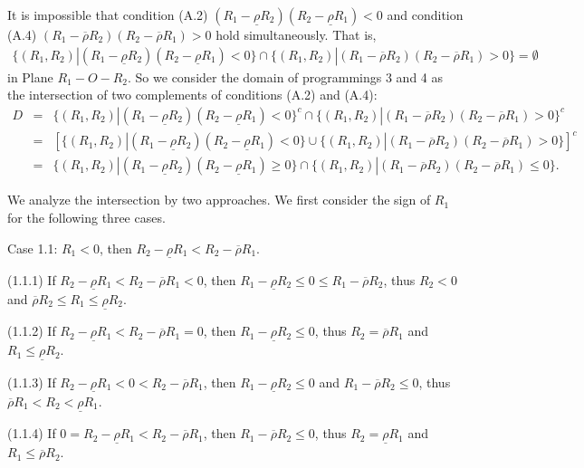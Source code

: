 \documentclass[10pt]{article}
\begin{document}
It is impossible that condition (A.2) $ (R_1 - \underline{\rho} R_2) (R_2 - \underline{\rho} R_1) < 0 $ and condition (A.4) $ (R_1 - \overline{\rho} R_2) (R_2 - \overline{\rho} R_1) > 0 $ hold simultaneously. That is,
\begin{eqnarray*}
\{ (R_1, R_2) | (R_1 - \underline{\rho} R_2) (R_2 - \underline{\rho} R_1) < 0 \} \cap \{ (R_1, R_2) | (R_1 - \overline{\rho} R_2) (R_2 - \overline{\rho} R_1) > 0 \} = \emptyset
\end{eqnarray*}
in Plane $ R_1 - O - R_2 $. So we consider the domain of programmings 3 and 4 as the intersection of two complements of conditions (A.2) and (A.4):
\begin{eqnarray*}
D & = & \{ (R_1, R_2) | (R_1 - \underline{\rho} R_2) (R_2 - \underline{\rho} R_1) < 0 \}^c \cap \{ (R_1, R_2) | (R_1 - \overline{\rho} R_2) (R_2 - \overline{\rho} R_1) > 0 \}^c \\
& = & \left[ \{ (R_1, R_2) | (R_1 - \underline{\rho} R_2) (R_2 - \underline{\rho} R_1) < 0 \} \cup \{ (R_1, R_2) | (R_1 - \overline{\rho} R_2) (R_2 - \overline{\rho} R_1) > 0 \} \right]^c \\
& = & \{ (R_1, R_2) | (R_1 - \underline{\rho} R_2) (R_2 - \underline{\rho} R_1) \geqslant 0 \} \cap \{ (R_1, R_2) | (R_1 - \overline{\rho} R_2) (R_2 - \overline{\rho} R_1) \leqslant 0 \}.
\end{eqnarray*}

We analyze the intersection by two approaches. We first consider the sign of $ R_1 $ for the following three cases.

Case 1.1: $ R_1 < 0 $, then $ R_2 - \underline{\rho} R_1 < R_2 - \overline{\rho} R_1 $.

(1.1.1) If $ R_2 - \underline{\rho} R_1 < R_2 - \overline{\rho} R_1 < 0 $, then $ R_1 - \underline{\rho} R_2 \leqslant 0 \leqslant R_1 - \overline{\rho} R_2 $, thus $ R_2 < 0 $ and $ \overline{\rho} R_2 \leqslant R_1 \leqslant \underline{\rho} R_2 $. 

(1.1.2) If $ R_2 - \underline{\rho} R_1 < R_2 - \overline{\rho} R_1 = 0 $, then $ R_1 - \underline{\rho} R_2 \leqslant 0 $, thus $ R_2 = \overline{\rho} R_1 $ and $ R_1 \leqslant \underline{\rho} R_2 $.

(1.1.3) If $ R_2 - \underline{\rho} R_1 < 0 < R_2 - \overline{\rho} R_1 $, then $ R_1 - \underline{\rho} R_2 \leqslant 0 $ and $ R_1 - \overline{\rho} R_2 \leqslant 0 $, thus $ \overline{\rho} R_1 < R_2 < \underline{\rho} R_1 $.

(1.1.4) If $ 0 = R_2 - \underline{\rho} R_1 < R_2 - \overline{\rho} R_1 $, then $ R_1 - \overline{\rho} R_2 \leqslant 0 $, thus $ R_2 = \underline{\rho} R_1 $ and $ R_1 \leqslant \overline{\rho} R_2 $.
\end{document}
